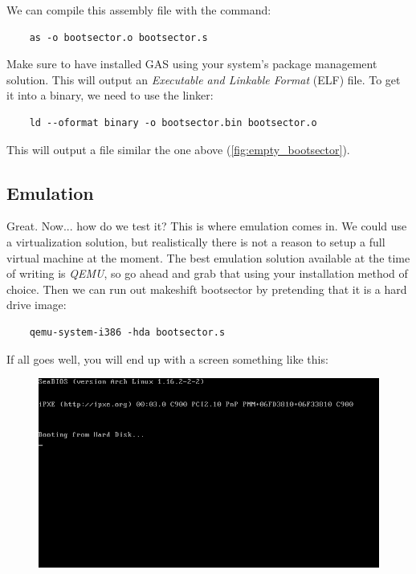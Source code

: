 \documentclass{article}
\begin{document}
We can compile this assembly file with the command:

\begin{Verbatim}
	as -o bootsector.o bootsector.s
\end{Verbatim}

Make sure to have installed GAS using your system's package management solution. This will output an \emph{Executable and Linkable Format} (ELF) file. To get it into a binary, we need to use the linker:

\begin{Verbatim}
	ld --oformat binary -o bootsector.bin bootsector.o
\end{Verbatim}

This will output a file similar the one above (\ref{fig:empty_bootsector}).

\subsection{Emulation}

Great. Now... how do we test it? This is where emulation comes in. We could use a virtualization solution, but
realistically there is not a reason to setup a full virtual machine at the moment. The best emulation solution
available at the time of writing is \emph{QEMU}, so go ahead and grab that using your installation method of
choice. Then we can run out makeshift bootsector by pretending that it is a hard drive image:

\begin{Verbatim}
	qemu-system-i386 -hda bootsector.s
\end{Verbatim}

If all goes well, you will end up with a screen something like this:

\begin{figure}[H]
	\includegraphics[width=\textwidth]{empty_bootsector.png}
\end{figure}
\end{document}
